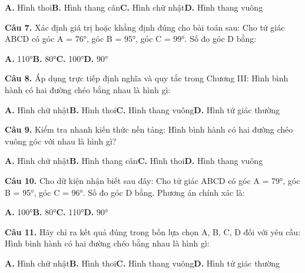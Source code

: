 \documentclass[11pt,a4paper]{article}
\begin{document}
\hspace*{1.5em}\textbf{A.} Hình thoi\quad\quad \textbf{B.} Hình thang cân\quad\quad \textbf{C.} Hình chữ nhật\quad\quad \textbf{D.} Hình thang vuông\par\vspace{2pt}
\textbf{\color{primary} Câu 7.} Xác định giá trị hoặc khẳng định đúng cho bài toán sau: Cho tứ giác ABCD có góc A = 76°, góc B = 95°, góc C = 99°. Số đo góc D bằng:\par
\hspace*{1.5em}\textbf{A.} 110°\quad\quad \textbf{B.} 80°\quad\quad \textbf{C.} 100°\quad\quad \textbf{D.} 90°\par\vspace{2pt}
\textbf{\color{primary} Câu 8.} Áp dụng trực tiếp định nghĩa và quy tắc trong Chương III: Hình bình hành có hai đường chéo bằng nhau là hình gì:\par
\hspace*{1.5em}\textbf{A.} Hình chữ nhật\quad\quad \textbf{B.} Hình thoi\quad\quad \textbf{C.} Hình thang vuông\quad\quad \textbf{D.} Hình tứ giác thường\par\vspace{2pt}
\textbf{\color{primary} Câu 9.} Kiểm tra nhanh kiến thức nền tảng: Hình bình hành có hai đường chéo vuông góc với nhau là hình gì?\par
\hspace*{1.5em}\textbf{A.} Hình chữ nhật\quad\quad \textbf{B.} Hình thang cân\quad\quad \textbf{C.} Hình thoi\quad\quad \textbf{D.} Hình thang vuông\par\vspace{2pt}
\textbf{\color{primary} Câu 10.} Cho dữ kiện nhận biết sau đây: Cho tứ giác ABCD có góc A = 79°, góc B = 95°, góc C = 96°. Số đo góc D bằng. Phương án chính xác là:\par
\hspace*{1.5em}\textbf{A.} 100°\quad\quad \textbf{B.} 80°\quad\quad \textbf{C.} 110°\quad\quad \textbf{D.} 90°\par\vspace{2pt}
\textbf{\color{primary} Câu 11.} Hãy chỉ ra kết quả đúng trong bốn lựa chọn A, B, C, D đối với yêu cầu: Hình bình hành có hai đường chéo bằng nhau là hình gì:\par
\hspace*{1.5em}\textbf{A.} Hình chữ nhật\quad\quad \textbf{B.} Hình thoi\quad\quad \textbf{C.} Hình thang vuông\quad\quad \textbf{D.} Hình tứ giác thường\par\vspace{2pt}
\end{document}
